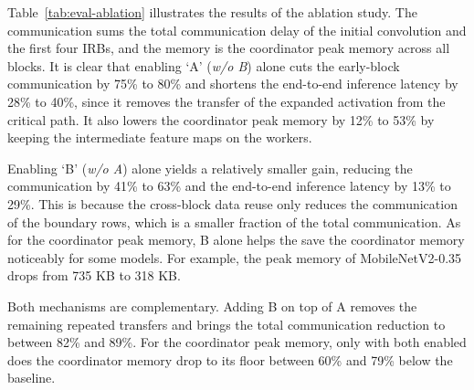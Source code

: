 Table~\ref{tab:eval-ablation} illustrates the results of the ablation study. The communication sums the total communication delay of the initial convolution and the first four IRBs, and the memory is the coordinator peak memory across all blocks. It is clear that enabling `A' (\emph{w/o B}) alone cuts the early-block communication by 75\% to 80\% and shortens the end-to-end inference latency by 28\% to 40\%, since it removes the transfer of the expanded activation from the critical path. It also lowers the coordinator peak memory by 12\% to 53\% by keeping the intermediate feature maps on the workers. 

Enabling `B' (\emph{w/o A}) alone yields a relatively smaller gain, reducing the communication by 41\% to 63\% and the end-to-end inference latency by 13\% to 29\%. 
This is because the cross-block data reuse only reduces the communication of the boundary rows, which is a smaller fraction of the total communication. 
As for the coordinator peak memory, B alone helps the save the coordinator memory noticeably for some models. For example, the peak memory of MobileNetV2-0.35 drops from 735 KB to 318 KB.

Both mechanisms are complementary. Adding B on top of A removes the remaining repeated transfers and brings the total communication reduction to between 82\% and 89\%. For the coordinator peak memory, only with both enabled does the coordinator memory drop to its floor between 60\% and 79\% below the baseline.


